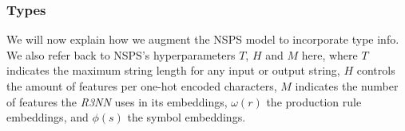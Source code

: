 \documentclass{article} %
\begin{document}





\subsubsection{Types} \label{sec:typednsps}

We will now explain how we augment the NSPS model to incorporate type info.
We also refer back to NSPS's hyperparameters $T$, $H$ and $M$ here,
where $T$ indicates the maximum string length for any input or output string,
$H$ controls the amount of features per one-hot encoded characters,
$M$ indicates the number of features the \emph{R3NN} uses in its embeddings,
$\omega(r)$ the production rule embeddings,
and $\phi(s)$ the symbol embeddings.
\end{document}

